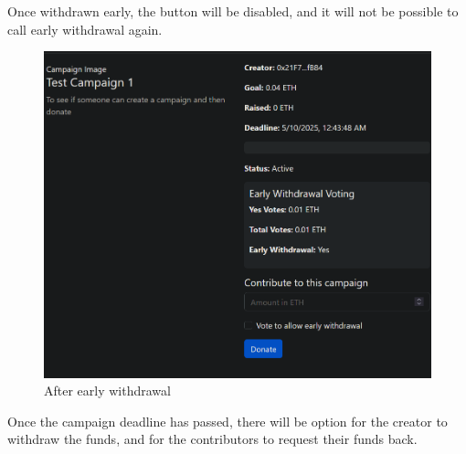 \documentclass[12pt,reqno]{article}
\begin{document}
Once withdrawn early, the button will be disabled, and it will 
not be possible to call early withdrawal again. 

\newpage 
\begin{figure}[h!]
    \centering
    \includegraphics[width=0.6\linewidth]{Pictures/ui5.png}
    \caption{After early withdrawal}
    \label{after_early}
\end{figure}

Once the campaign deadline has passed, there will be option 
for the creator to withdraw the funds, and for the contributors 
to request their funds back. 
\end{document}
